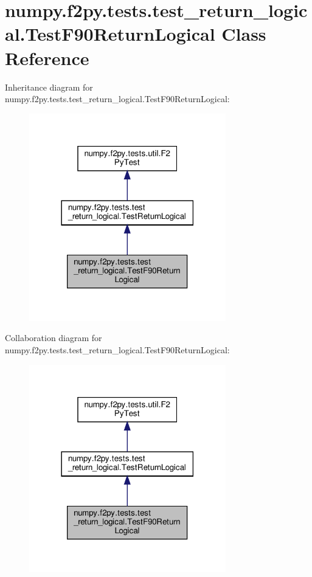 \hypertarget{classnumpy_1_1f2py_1_1tests_1_1test__return__logical_1_1TestF90ReturnLogical}{}\section{numpy.\+f2py.\+tests.\+test\+\_\+return\+\_\+logical.\+Test\+F90\+Return\+Logical Class Reference}
\label{classnumpy_1_1f2py_1_1tests_1_1test__return__logical_1_1TestF90ReturnLogical}


Inheritance diagram for numpy.\+f2py.\+tests.\+test\+\_\+return\+\_\+logical.\+Test\+F90\+Return\+Logical\+:
\nopagebreak
\begin{figure}[H]
\begin{center}
\leavevmode
\includegraphics[width=242pt]{classnumpy_1_1f2py_1_1tests_1_1test__return__logical_1_1TestF90ReturnLogical__inherit__graph}
\end{center}
\end{figure}


Collaboration diagram for numpy.\+f2py.\+tests.\+test\+\_\+return\+\_\+logical.\+Test\+F90\+Return\+Logical\+:
\nopagebreak
\begin{figure}[H]
\begin{center}
\leavevmode
\includegraphics[width=242pt]{classnumpy_1_1f2py_1_1tests_1_1test__return__logical_1_1TestF90ReturnLogical__coll__graph}
\end{center}
\end{figure}
